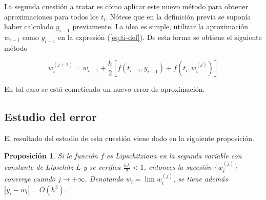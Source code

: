 \documentclass{article}
\theoremstyle{theorem-style}  %
\newtheorem{proposition}[theorem]{Proposición}
\theoremstyle{definition}
\theoremstyle{example-style}
\begin{document}
	La segunda cuestión a tratar es cómo aplicar este nuevo método para obtener aproximaciones para todos los $t_i$. Nótese que en la definición previa se suponía haber calculado $y_{i-1}$ previamente. La idea es simple, utilizar la aproximación $w_{i-1}$ como $y_{i-1}$ en la expresión (\ref{eq:ti-def}). De esta forma se obtiene el siguiente método
	
	\begin{equation} \label{eq:ti-def-2}
	w_{i} ^{(j+1)} = w_{i-1} + \frac{h}{2} \left[f(t_{i-1}, y_{i-1}) + f(t_i, w_{i}^{(j)})\right]
	\end{equation}
	
	
	En tal caso se está cometiendo un nuevo error de aproximación.
	
	\subsection{Estudio del error} \label{sec:trapecio-iterativo:error}

		El resultado del estudio de esta cuestión viene dado en la siguiente proposición.
		
		\begin{proposition}
			Si la función $f$ es Lipschitziana en la segunda variable con constante de Lipschitz $L$ y se verifica $\frac{hL}{2} < 1$, entonces la sucesión $\{w_i^{(j)}\}$ converge cuando $j \rightarrow +\infty$. Denotando $w_i = \lim w_i^{(j)}$, se tiene además $\left|y_{i} - w_{i}\right| = O(h^3)$.
		\end{proposition}
		
\end{document}
